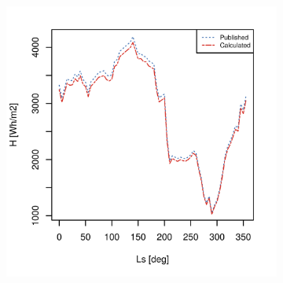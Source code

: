 \begin{figure}[h]
\captionsetup[subfigure]{justification=centering}
\vspace{-2ex}
\centering
    \setlength{\subfigureWidth}{0.50\textwidth}
    \setlength{\graphicsHeight}{60mm}
    \hypersetup{hidelinks=true}%
    \begin{subfigure}[t]{\subfigureWidth}
        \centering
            \includegraphics[height=\graphicsHeight]{sections/appendix/insolation-calculation-verification/plots/h-exp-calc-at-vl1-with-beta-65-deg.png}
            \label{fig:sub:comparative-global-insolation-at-vl1-beta-optimal-daily-variations}
    \end{subfigure}\hfill
    \begin{subfigure}[t]{\subfigureWidth}
        \centering

\end{subfigure}
\end{figure}
